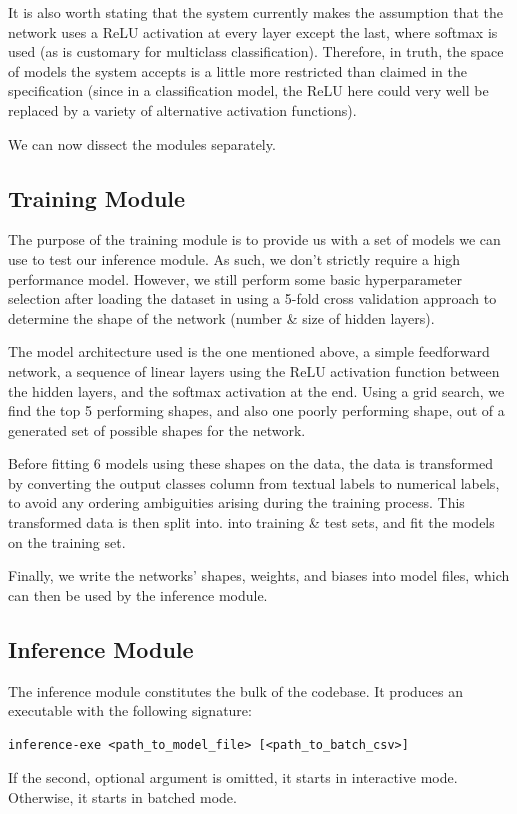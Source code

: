 \documentclass[12pt]{article}
\begin{document}
It is also worth stating that the system currently makes the assumption that the network uses a ReLU activation at every layer except the last, where softmax is used (as is customary for multiclass classification). Therefore, in truth, the space of models the system accepts is a little more restricted than claimed in the specification (since in a classification model, the ReLU here could very well be replaced by a variety of alternative activation functions).\bigskip

We can now dissect the modules separately.

\subsection{Training Module}
The purpose of the training module is to provide us with a set of models we can use to test our inference module. As such, we don't strictly require a high performance model. However, we still perform some basic hyperparameter selection after loading the dataset in using a 5-fold cross validation approach to determine the shape of the network (number \& size of hidden layers).\bigskip

The model architecture used is the one mentioned above, a simple feedforward network, a sequence of linear layers using the ReLU activation function between the hidden layers, and the softmax activation at the end. Using a grid search, we find the top 5 performing shapes, and also one poorly performing shape, out of a generated set of possible shapes for the network.\bigskip

Before fitting 6 models using these shapes on the data, the data is transformed by converting the output classes column from textual labels to numerical labels, to avoid any ordering ambiguities arising during the training process. This transformed data is then split into. into training \& test sets, and fit the models on the training set.\bigskip

Finally, we write the networks' shapes, weights, and biases into model files, which can then be used by the inference module.

\subsection{Inference Module}
The inference module constitutes the bulk of the codebase. It produces an executable with the following signature:
\begin{verbatim}
inference-exe <path_to_model_file> [<path_to_batch_csv>]
\end{verbatim}
If the second, optional argument is omitted, it starts in interactive mode. Otherwise, it starts in batched mode.\bigskip
\end{document}
